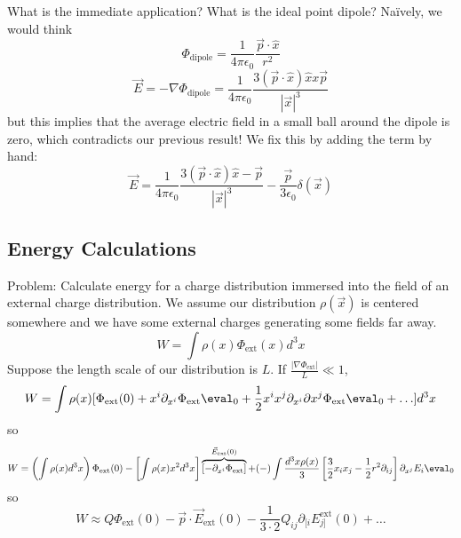 \documentclass[a4paper,twoside,master.tex]{subfiles}
\begin{document}
What is the immediate application? What is the ideal point dipole? Na\"ively, we would think
\begin{equation}
    \Phi_{\text{dipole}} =\frac{1}{4\pi\epsilon_0} \frac{\vec{p}\cdot\hat{x}}{r^2}
\end{equation}
\begin{equation}
    \vec{E}=-\nabla \Phi_{\text{dipole}} =\frac{1}{4\pi\epsilon_0} \frac{3(\vec{p}\cdot \hat{x})\hat{x}x\vec{p}}{|\vec{x}|^3}
\end{equation}
but this implies that the average electric field in a small ball around the dipole is zero, which contradicts our previous result! We fix this by adding the term by hand:
\begin{equation}
    \vec{E} = \frac{1}{4\pi\epsilon_0} \frac{3(\vec{p}\cdot \hat{x})\hat{x}-\vec{p}}{|\vec{x}|^3}- \frac{\vec{p}}{3\epsilon_0}\delta(\vec{x})
\end{equation}

\subsection{Energy Calculations}%
\label{sub:energy_calculat}

Problem: Calculate energy for a charge distribution immersed into the field of an external charge distribution. We assume our distribution $\rho(\vec{x})$ is centered somewhere and we have some external charges generating some fields far away.
\begin{equation}
    W  = \int\rho(x)\Phi_\text{ext}(x)d^3x
\end{equation}
Suppose the length scale of our distribution is $L$. If $\frac{|\nabla \Phi_\text{ext}|}{L}\ll 1$,
\begin{equation}
    W = \int\rho(x)[\Phi_\text{ext}(0) + x^i\partial_{x^i}\Phi_\text{ext}\eval_0 + \frac{1}{2}x^i x^j \partial_{x^i}\partial{x^j}\Phi_\text{ext}\eval_0+\ldots]d^3x
\end{equation}
so
\begin{equation}
    W = \left( \int\rho(x)d^3x \right)\Phi_\text{ext}(0) - \left[ \int\rho(x) x^2 d^3x \right]\overbrace{\left[ -\partial_{x^i}\Phi_\text{ext}\right]}^{\vec{E}_\text{ext}(0)} + (-)\int \frac{d^3x\rho(x)}{3}\left[\frac{3}{2}x_i x_j - \frac{1}{2}r^2\partial_{ij}\right]\partial_{x^j} E_i\eval_0
\end{equation}
so
\begin{equation}
    W\approx Q\Phi_\text{ext}(0) - \vec{p}\cdot \vec{E}_\text{ext}(0) - \frac{1}{3\cdot 2}Q_{ij}\partial_{[i}E_{j]}^\text{ext}(0)+\ldots
\end{equation}
\end{document}
